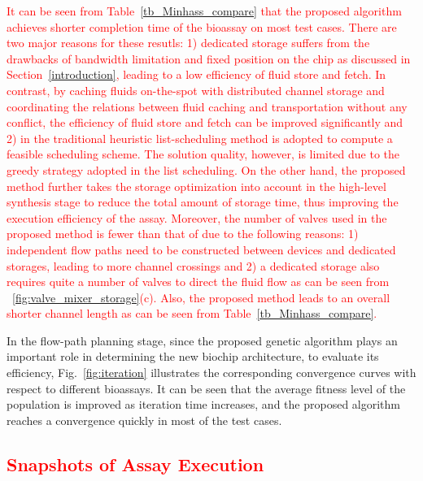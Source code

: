 \textcolor{red}{
   It can be seen from Table~\ref{tb_Minhass_compare} that the proposed algorithm achieves shorter completion time of the bioassay on most test cases. There are two major reasons for these resutls: 1) dedicated storage suffers from the drawbacks of bandwidth limitation and fixed position on the chip as discussed in Section~\ref{introduction}, leading to a low efficiency of fluid store and fetch. In contrast, by caching fluids on-the-spot with distributed channel storage and coordinating the relations between fluid caching and transportation without any conflict, the efficiency of fluid store and fetch can be improved significantly and 2) in \cite{minhass2012architectural} the traditional heuristic list-scheduling method is adopted to compute a feasible scheduling scheme. The solution quality, however, is limited due to the greedy strategy adopted in the list scheduling. On the other hand, the proposed method further takes the storage optimization into account in the high-level synthesis stage to reduce the total amount of storage time, thus improving the execution efficiency of the assay. Moreover, the number of valves used in the proposed method is fewer than that of \cite{minhass2012architectural} due to the following reasons: 1) independent flow paths need to be constructed between devices and dedicated storages, leading to more channel crossings and 2) a dedicated storage also requires quite a number of valves to direct the fluid flow as can be seen from \figname~\ref{fig:valve_mixer_storage}(c). Also, the proposed method leads to an overall shorter channel length as can be seen from Table~\ref{tb_Minhass_compare}.}

In the flow-path planning stage, since the proposed genetic algorithm plays an important role in determining the new biochip architecture, to evaluate its efficiency, Fig.~\ref{fig:iteration} illustrates the corresponding convergence curves with respect to different bioassays. It can be seen that the average fitness level of the population is improved as iteration time increases, and the proposed algorithm reaches a convergence quickly in most of the test cases.


\subsection{\textcolor{red}{Snapshots of Assay Execution}}


